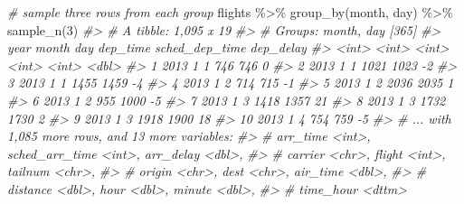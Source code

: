 \documentclass[
]{book}
\newenvironment{Shaded}{\begin{snugshade}}{\end{snugshade}}
\newcommand{\CommentTok}[1]{\textcolor[rgb]{0.56,0.35,0.01}{\textit{#1}}}
\newcommand{\DecValTok}[1]{\textcolor[rgb]{0.00,0.00,0.81}{#1}}
\newcommand{\FunctionTok}[1]{\textcolor[rgb]{0.00,0.00,0.00}{#1}}
\newcommand{\NormalTok}[1]{#1}
\newcommand{\SpecialCharTok}[1]{\textcolor[rgb]{0.00,0.00,0.00}{#1}}
\begin{document}
\begin{Shaded}
\begin{Highlighting}[]
\CommentTok{\# sample three rows from each group}
\NormalTok{flights }\SpecialCharTok{\%\textgreater{}\%} \FunctionTok{group\_by}\NormalTok{(month, day) }\SpecialCharTok{\%\textgreater{}\%} \FunctionTok{sample\_n}\NormalTok{(}\DecValTok{3}\NormalTok{)}
\CommentTok{\#\textgreater{} \# A tibble: 1,095 x 19}
\CommentTok{\#\textgreater{} \# Groups:   month, day [365]}
\CommentTok{\#\textgreater{}     year month   day dep\_time sched\_dep\_time dep\_delay}
\CommentTok{\#\textgreater{}    \textless{}int\textgreater{} \textless{}int\textgreater{} \textless{}int\textgreater{}    \textless{}int\textgreater{}          \textless{}int\textgreater{}     \textless{}dbl\textgreater{}}
\CommentTok{\#\textgreater{}  1  2013     1     1      746            746         0}
\CommentTok{\#\textgreater{}  2  2013     1     1     1021           1023        {-}2}
\CommentTok{\#\textgreater{}  3  2013     1     1     1455           1459        {-}4}
\CommentTok{\#\textgreater{}  4  2013     1     2      714            715        {-}1}
\CommentTok{\#\textgreater{}  5  2013     1     2     2036           2035         1}
\CommentTok{\#\textgreater{}  6  2013     1     2      955           1000        {-}5}
\CommentTok{\#\textgreater{}  7  2013     1     3     1418           1357        21}
\CommentTok{\#\textgreater{}  8  2013     1     3     1732           1730         2}
\CommentTok{\#\textgreater{}  9  2013     1     3     1918           1900        18}
\CommentTok{\#\textgreater{} 10  2013     1     4      754            759        {-}5}
\CommentTok{\#\textgreater{} \# ... with 1,085 more rows, and 13 more variables:}
\CommentTok{\#\textgreater{} \#   arr\_time \textless{}int\textgreater{}, sched\_arr\_time \textless{}int\textgreater{}, arr\_delay \textless{}dbl\textgreater{},}
\CommentTok{\#\textgreater{} \#   carrier \textless{}chr\textgreater{}, flight \textless{}int\textgreater{}, tailnum \textless{}chr\textgreater{},}
\CommentTok{\#\textgreater{} \#   origin \textless{}chr\textgreater{}, dest \textless{}chr\textgreater{}, air\_time \textless{}dbl\textgreater{},}
\CommentTok{\#\textgreater{} \#   distance \textless{}dbl\textgreater{}, hour \textless{}dbl\textgreater{}, minute \textless{}dbl\textgreater{},}
\CommentTok{\#\textgreater{} \#   time\_hour \textless{}dttm\textgreater{}}


\end{Highlighting}
\end{Shaded}
\end{document}
